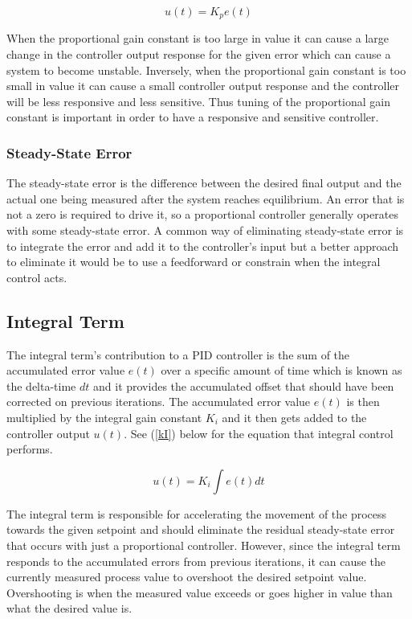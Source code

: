 \documentclass[10pt,conference]{IEEEtran}
\begin{document}
\begin{equation}
    \displaystyle {u(t)=K_pe(t)}\label{kP}
\end{equation}

When the proportional gain constant is too large in value it can cause a large change in the controller
output response for the given error which can cause a system to become unstable. Inversely, when the
proportional gain  constant is too small in value it can cause a small controller output response and
the controller will be less responsive and less sensitive. Thus tuning of the proportional gain
constant is important in order to have a responsive and sensitive controller.

\subsubsection{Steady-State Error}

The steady-state error is the difference between the desired final output and the actual one being
measured after the system reaches equilibrium. An error that is not a zero is required to drive
it, so a proportional controller generally operates with some steady-state error. A common way
of eliminating steady-state error is to integrate the error and add it to the controller's input
but a better approach to eliminate it would be to use a feedforward or constrain when the
integral control acts.

\subsection{Integral Term}

The integral term's contribution to a PID controller is the sum of the accumulated error
value \(e(t)\) over a specific amount of time which is known as the delta-time \(dt\) and
it provides the accumulated offset that should have been corrected on previous iterations.
The accumulated error value \(e(t)\) is then multiplied by the integral gain constant
\(K_i\) and it then gets added to the controller output \(u(t)\). See (\ref{kI}) below
for the equation that integral control performs.

\begin{equation}
    \displaystyle {u(t)=K_i\int e(t)dt}\label{kI}
\end{equation}

The integral term is responsible for accelerating the movement of the process towards the given
setpoint and should eliminate the residual steady-state error that occurs with just a proportional
controller. However, since the integral term responds to the accumulated errors from previous
iterations, it can cause the currently measured process value to overshoot the desired setpoint
value. Overshooting is when the measured value exceeds or goes higher in value than what the
desired value is.
\end{document}
